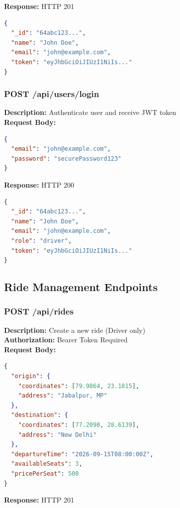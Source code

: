 \documentclass[12pt,a4paper]{article}
\begin{document}
\textbf{Response:} HTTP 201
\begin{lstlisting}[language=JSON]
{
  "_id": "64abc123...",
  "name": "John Doe",
  "email": "john@example.com",
  "token": "eyJhbGciOiJIUzI1NiIs..."
}
\end{lstlisting}

\subsubsection{POST /api/users/login}
\textbf{Description:} Authenticate user and receive JWT token\\
\textbf{Request Body:}
\begin{lstlisting}[language=JSON]
{
  "email": "john@example.com",
  "password": "securePassword123"
}
\end{lstlisting}

\textbf{Response:} HTTP 200
\begin{lstlisting}[language=JSON]
{
  "_id": "64abc123...",
  "name": "John Doe",
  "email": "john@example.com",
  "role": "driver",
  "token": "eyJhbGciOiJIUzI1NiIs..."
}
\end{lstlisting}

\subsection{Ride Management Endpoints}

\subsubsection{POST /api/rides}
\textbf{Description:} Create a new ride (Driver only)\\
\textbf{Authorization:} Bearer Token Required\\
\textbf{Request Body:}
\begin{lstlisting}[language=JSON]
{
  "origin": {
    "coordinates": [79.9864, 23.1815],
    "address": "Jabalpur, MP"
  },
  "destination": {
    "coordinates": [77.2090, 28.6139],
    "address": "New Delhi"
  },
  "departureTime": "2026-09-15T08:00:00Z",
  "availableSeats": 3,
  "pricePerSeat": 500
}
\end{lstlisting}

\textbf{Response:} HTTP 201
\end{document}
